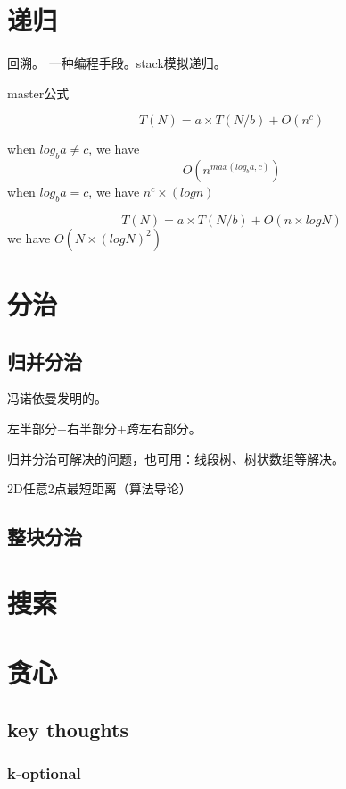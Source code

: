 \documentclass[UTF8]{../computerUniverse}
\begin{document}
\section{递归}
回溯。
一种编程手段。stack模拟递归。

master公式

$$
T(N) = a \times T(N/b) + O(n^c)
$$

when $log_b a \ne c$, we have 
$$O(n^{max(log_b a,c)})$$
when $log_b a = c$, we have $n^c\times (log n)$

$$
T(N) = a \times T(N/b) + O(n \times log N)
$$
we have $O(N \times (log N)^2)$



\section{分治}



\subsection{归并分治}

冯诺依曼发明的。

左半部分+右半部分+跨左右部分。

归并分治可解决的问题，也可用：线段树、树状数组等解决。

2D任意2点最短距离（算法导论）

\subsection{整块分治}

\section{搜索}



\section{贪心}


\subsection{key thoughts}

\subsubsection{k-optional}
\end{document}
